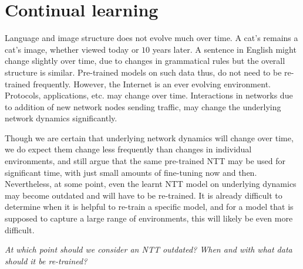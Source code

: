 \section{Continual learning}
\label{sec:cont}

Language and image structure does not evolve much over time. A cat's remains a cat's image, whether viewed today or $10$ years later. A sentence in English might change slightly over time, due to changes in grammatical rules but the overall structure is similar. Pre-trained models on such data thus, do not need to be re-trained frequently. However, the Internet is an ever evolving environment. Protocols, applications, etc. may change over time. Interactions in networks due to addition of new network nodes sending traffic, may change the underlying network dynamics significantly.

Though we are certain that underlying network dynamics will change over time, we do expect them change less frequently than changes in individual environments, and still argue that the same pre-trained NTT may be used for significant time, with just small amounts of fine-tuning now and then. Nevertheless, at some point, even the learnt NTT model on underlying dynamics may become outdated and will have to be re-trained. It is already difficult to determine when it is helpful to re-train a specific model\cite{puffer}, and for a model that is supposed to capture a large range of environments, this will likely be even more difficult.

\emph{At which point should we consider an NTT outdated? When and with what data should it be re-trained?}





